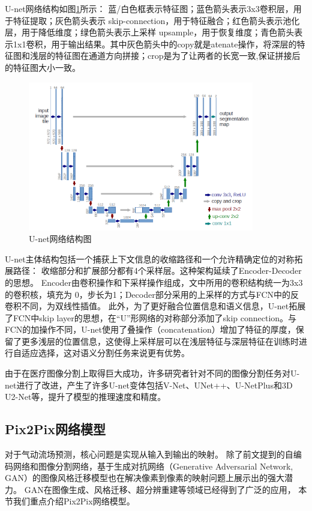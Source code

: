 U-net网络结构如图\ref{fig:unet}所示：
蓝/白色框表示特征图；蓝色箭头表示3x3卷积层，用于特征提取；灰色箭头表示 skip-connection，用于特征融合；红色箭头表示池化层，用于降低维度；绿色箭头表示上采样 upsample，用于恢复维度；青色箭头表示1x1卷积，用于输出结果。其中灰色箭头中的copy就是atenate操作，将深层的特征图和浅层的特征图在通道方向拼接；crop是为了让两者的长宽一致,保证拼接后的特征图大小一致。


\begin{figure}[htp]
	\centering
	\includegraphics[width=0.88\textwidth]{figures/unet.png}
	\caption{U-net网络结构图\cite{DBLP:conf/miccai/RonnebergerFB15}}
	\label{fig:unet}
\end{figure}

U-net主体结构包括一个捕获上下文信息的收缩路径和一个允许精确定位的对称拓展路径：
收缩部分和扩展部分都有4个采样层。这种架构延续了Encoder-Decoder的思想。
Encoder由卷积操作和下采样操作组成，文中所用的卷积结构统一为3x3的卷积核，填充为 0，步长为1；Decoder部分采用的上采样的方式与FCN中的反卷积不同，为双线性插值。
此外，为了更好融合位置信息和语义信息，U-net拓展了FCN中skip layer的思想，在“U”形网络的对称部分添加了skip connection。与FCN的加操作不同，U-net使用了叠操作（concatenation）增加了特征的厚度，保留了更多浅层的位置信息，这使得上采样层可以在浅层特征与深层特征在训练时进行自适应选择，这对语义分割任务来说更有优势。

由于在医疗图像分割上取得巨大成功，许多研究者针对不同的图像分割任务对U-net进行了改进，产生了许多U-net变体包括V-Net\cite{2016V}、UNet++\cite{unet++}、U-NetPlus\cite{unetplus}和3D U2-Net\cite{20193D}等，提升了模型的推理速度和精度。


\subsection{Pix2Pix网络模型}
对于气动流场预测，核心问题是实现从输入到输出的映射。
除了前文提到的自编码网络和图像分割网络，基于生成对抗网络（Generative Adversarial Network, GAN）的图像风格迁移模型也在解决像素到像素的映射问题上展示出的强大潜力。
GAN在图像生成、风格迁移、超分辨重建等领域已经得到了广泛的应用，
本节我们重点介绍Pix2Pix网络模型\cite{isola2017image}。

